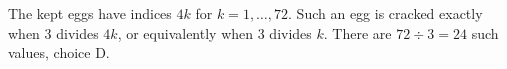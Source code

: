 The kept eggs have indices $4k$ for $k=1,\ldots,72$. Such an egg is cracked exactly when 3 divides $4k$, or equivalently when 3 divides $k$. There are $72\div3=\boxed{24}$ such values, choice D.
